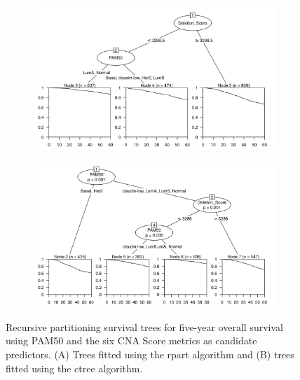 \begin{figure}[!htb]
\centering

\vspace{0.5cm}

\begin{subfigure}{\textwidth}
\subcaption{}
\includegraphics[width=1\textwidth]{../figures/Appendices/Appendix_B/PartyKit_Survival_Score_FiveYearOS_PAM50.png}
\end{subfigure}

\vspace{2cm}

\begin{subfigure}{\textwidth}
\subcaption{}
\includegraphics[width=1\textwidth]{../figures/Appendices/Appendix_B/Ctree_Survival_Score_FiveYearOS_PAM50.png}
\end{subfigure}

\vspace{0.5cm}

\caption[Recursive partitioning survival trees for five-year overall survival using PAM50 and the six CNA Score metrics as candidate predictors.]{Recursive partitioning survival trees for five-year overall survival using PAM50 and the six CNA Score metrics as candidate predictors. (A) Trees fitted using the rpart algorithm and (B) trees fitted using the ctree algorithm.}
\end{figure}

